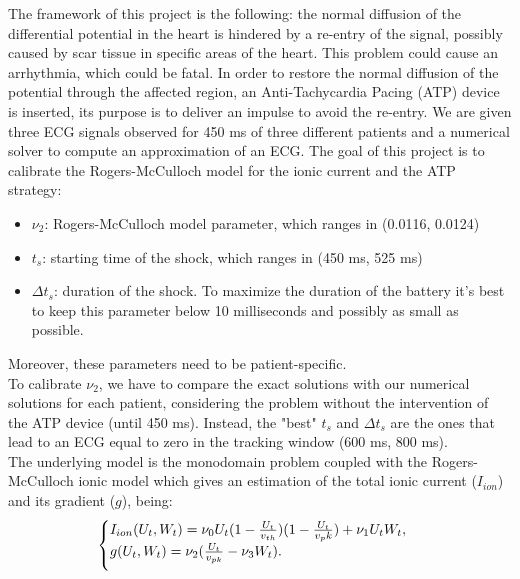 \documentclass[11pt,a4paper]{article}
\begin{document}
The framework of this project is the following: the normal diffusion of the differential potential in the heart is hindered by a re-entry of the signal, possibly caused by scar tissue in specific areas of the heart. This problem could cause an arrhythmia, which could be fatal. In order to restore the normal diffusion of the potential through the affected region, an Anti-Tachycardia Pacing (ATP) device is inserted, its purpose is to deliver an impulse to avoid the re-entry.\newline
We are given three ECG signals observed for 450 ms of three different patients and a numerical solver to compute an approximation of an ECG. The goal of this project is to calibrate the Rogers-McCulloch model for the ionic current and the ATP strategy:
\vspace{1mm}
\begin{itemize}\setlength\itemsep{1.5mm}
    \item $\nu_2$: Rogers-McCulloch model parameter, which ranges in (0.0116, 0.0124)
    \item $t_s$: starting time of the shock, which ranges in (450 ms, 525 ms)
    \item $\Delta t_{s}$: duration of the shock. To maximize the duration of the battery it's best to keep this parameter below 10 milliseconds and possibly as small as possible.
\end{itemize}
\vspace{1mm}
Moreover, these parameters need to be patient-specific.\vspace{1mm}\\
\noindent To calibrate $\nu_2$, we have to compare the exact solutions with our numerical solutions for each patient, considering the problem without the intervention of the ATP device (until 450 ms). Instead, the "best" $t_{s}$ and $\Delta t_{s}$ are the ones that lead to an ECG equal to zero in the tracking window (600 ms, 800 ms).\\
The underlying model is the monodomain problem coupled with the Rogers-McCulloch ionic model which gives an estimation of the total ionic current ($I_{ion}$) and its gradient ($g$), being:
    \begin{equation}\label{model}
	\begin{cases}
	I_{ion}(U_t, W_t) = \nu_0 U_t (1-\frac{U_t}{v_{th}})(1-\frac{U_t}{v_pk})+\nu_1 U_t W_t,
	\\
	\vspace{2mm}
	g(U_t, W_t) = \nu_2 (\frac{U_t}{v_{pk}}-\nu_3 W_t).
	\end{cases}
    \end{equation}
\end{document}
